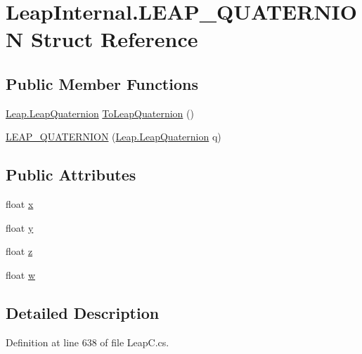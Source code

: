 \hypertarget{struct_leap_internal_1_1_l_e_a_p___q_u_a_t_e_r_n_i_o_n}{}\section{Leap\+Internal.\+L\+E\+A\+P\+\_\+\+Q\+U\+A\+T\+E\+R\+N\+I\+ON Struct Reference}
\label{struct_leap_internal_1_1_l_e_a_p___q_u_a_t_e_r_n_i_o_n}
\subsection*{Public Member Functions}
\begin{DoxyCompactItemize}
\item 
\mbox{\hyperlink{struct_leap_1_1_leap_quaternion}{Leap.\+Leap\+Quaternion}} \mbox{\hyperlink{struct_leap_internal_1_1_l_e_a_p___q_u_a_t_e_r_n_i_o_n_ae9aabe56e3864a08cbcedb39db9c2dae}{To\+Leap\+Quaternion}} ()
\item 
\mbox{\hyperlink{struct_leap_internal_1_1_l_e_a_p___q_u_a_t_e_r_n_i_o_n_a9511e831cff842f8ca1111440ebe0107}{L\+E\+A\+P\+\_\+\+Q\+U\+A\+T\+E\+R\+N\+I\+ON}} (\mbox{\hyperlink{struct_leap_1_1_leap_quaternion}{Leap.\+Leap\+Quaternion}} q)
\end{DoxyCompactItemize}
\subsection*{Public Attributes}
\begin{DoxyCompactItemize}
\item 
float \mbox{\hyperlink{struct_leap_internal_1_1_l_e_a_p___q_u_a_t_e_r_n_i_o_n_a587fe9e9da4dad4c6e37cef603b12d0d}{x}}
\item 
float \mbox{\hyperlink{struct_leap_internal_1_1_l_e_a_p___q_u_a_t_e_r_n_i_o_n_a0b7822710cf1629a7b9c17cc2c88f11a}{y}}
\item 
float \mbox{\hyperlink{struct_leap_internal_1_1_l_e_a_p___q_u_a_t_e_r_n_i_o_n_a929a6fe22258fab61778eba9bc2390af}{z}}
\item 
float \mbox{\hyperlink{struct_leap_internal_1_1_l_e_a_p___q_u_a_t_e_r_n_i_o_n_a6957a5fe7e79e94a9b79288a1c5b02f5}{w}}
\end{DoxyCompactItemize}


\subsection{Detailed Description}


Definition at line 638 of file Leap\+C.\+cs.



